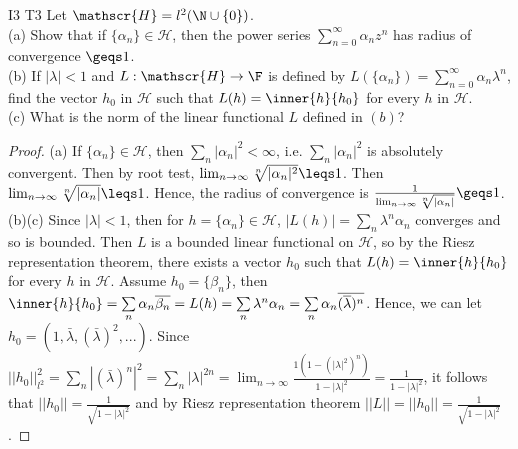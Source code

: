 \begin{exercise}{I3 T3}{}
    Let $\mathscr{H}=l^2(\N\cup \{0\})$. \\
    (a) Show that if $\{\alpha_n\}\in \mathscr{H}$, then the power series $\sum\limits_{n=0}^{\infty} \alpha_n z^n$ 
    has radius of convergence $\geqs 1$.\\
    (b) If $|\lambda|<1$ and $L:\mathscr{H}\rightarrow \F$ is defined by $L(\{\alpha_n\})=\sum\limits_{n=0}^{\infty}\alpha_n\lambda^n$, 
    find the vector $h_0$ in $\mathscr{H}$ such that $L(h)=\inner{h}{h_0}$ for every $h$ in $\mathscr{H}$.\\
    (c) What is the norm of the linear functional $L$ defined in $(b)$?
\end{exercise}

\begin{proof}
    (a) If $\{\alpha_n\}\in\mathscr{H}$, then $\sum\limits_{n}|\alpha_n|^2<\infty$, i.e. 
    $\sum\limits_{n}|\alpha_n|^2$ is absolutely convergent. Then by root test, $\lim_{n\rightarrow \infty}\sqrt[n]{|\alpha_n|^2}\leqs 1$.
    Then $\lim_{n\rightarrow \infty}\sqrt[n]{|\alpha_n|}\leqs 1$. 
    Hence, the radius of convergence is $\frac{1}{\lim_{n\rightarrow \infty}\sqrt[n]{|\alpha_n|}}\geqs 1$.
    \\
    (b)(c) Since $|\lambda|<1$, then for $h=\{\alpha_n\}\in \mathscr{H}$, $|L(h)|=\sum\limits_{n}\lambda^n \alpha_n$ converges and so is bounded.
    Then $L$ is a bounded linear functional on $\mathscr{H}$, so by the Riesz representation theorem,
    there exists a vector $h_0$ such that $L(h)=\inner{h}{h_0}$ for every $h$ in $\mathscr{H}$.
    Assume $h_0=\{\beta_n\}$, then $\inner{h}{h_0}=\sum\limits_{n}\alpha_n\overline{\beta_n}=L(h)=\sum\limits_{n}\lambda^n\alpha_n=\sum\limits_{n}\alpha_n\overline{(\overline{\lambda})^n}$.
    Hence, we can let $h_0=(1,\bar{\lambda}, (\bar{\lambda})^2,...)$. 
    Since $||h_0||_{l^2}^2=\sum\limits_{n}|(\bar{\lambda})^n|^2=\sum\limits_{n}|\lambda|^{2n}=\lim_{n\rightarrow \infty}\frac{1(1-(|\lambda|^2)^n)}{1-|\lambda|^2}=\frac{1}{1-|\lambda|^2}$,
    it follows that $||h_0||=\frac{1}{\sqrt{1-|\lambda|^2}}$ and by Riesz representation theorem $||L||=||h_0||=\frac{1}{\sqrt{1-|\lambda|^2}}$.
\end{proof}

